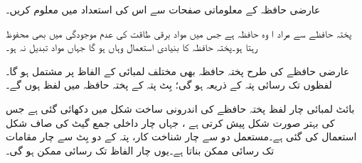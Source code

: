 عارضی حافظہ کے معلوماتی صفحات سے اس کی استعداد  میں معلوم کریں۔



پختہ حافظے سے مراد ا وہ حافظہ ہے جس میں مواد برقی طاقت کی عدم موجودگی میں بھی محفوظ رہتا ہو۔پختہ حافظہ کا بنیادی استعمال وہاں ہو گا جہاں مواد تبدیل نہ ہو۔

عارضی حافظے کی طرح پختہ حافظہ بھی مختلف لمبائی کے الفاظ پر مشتمل ہو گا۔لفظوں تک رسائی پتہ کے ذریعہ ہو گی؛  بِٹ پتہ کے پختہ حافظہ میں  لفظ ہوں گے۔

بائٹ لمبائی چار لفظ پختہ حافظے کی اندرونی ساخت شکل    میں دکھائی گئی ہے جس کی بہتر صورت شکل   پیش کرتی ہے ، جہاں چار داخلی جمع گیٹ کی صاف شکل استعمال کی گئی ہے۔مستعمل دو سے چار شناخت کار، پتہ کے دو بِٹ سے چار مقامات تک رسائی ممکن بناتا ہے۔یوں چار الفاظ تک رسائی ممکن ہو گی۔
